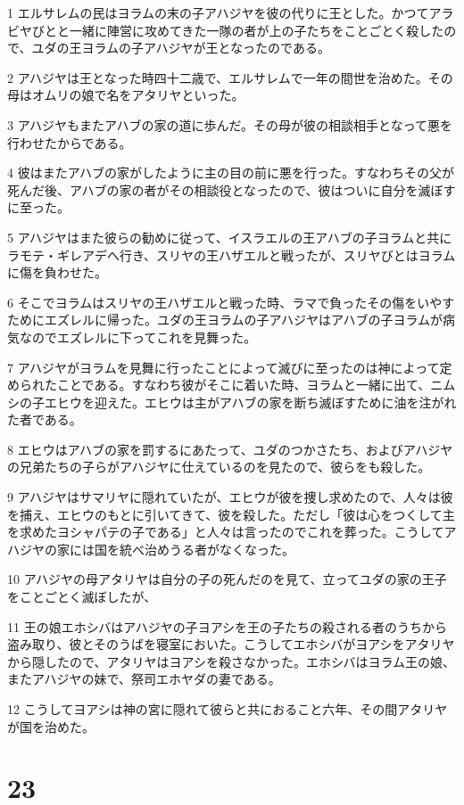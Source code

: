 \par 1 エルサレムの民はヨラムの末の子アハジヤを彼の代りに王とした。かつてアラビヤびとと一緒に陣営に攻めてきた一隊の者が上の子たちをことごとく殺したので、ユダの王ヨラムの子アハジヤが王となったのである。
\par 2 アハジヤは王となった時四十二歳で、エルサレムで一年の間世を治めた。その母はオムリの娘で名をアタリヤといった。
\par 3 アハジヤもまたアハブの家の道に歩んだ。その母が彼の相談相手となって悪を行わせたからである。
\par 4 彼はまたアハブの家がしたように主の目の前に悪を行った。すなわちその父が死んだ後、アハブの家の者がその相談役となったので、彼はついに自分を滅ぼすに至った。
\par 5 アハジヤはまた彼らの勧めに従って、イスラエルの王アハブの子ヨラムと共にラモテ・ギレアデへ行き、スリヤの王ハザエルと戦ったが、スリヤびとはヨラムに傷を負わせた。
\par 6 そこでヨラムはスリヤの王ハザエルと戦った時、ラマで負ったその傷をいやすためにエズレルに帰った。ユダの王ヨラムの子アハジヤはアハブの子ヨラムが病気なのでエズレルに下ってこれを見舞った。
\par 7 アハジヤがヨラムを見舞に行ったことによって滅びに至ったのは神によって定められたことである。すなわち彼がそこに着いた時、ヨラムと一緒に出て、ニムシの子エヒウを迎えた。エヒウは主がアハブの家を断ち滅ぼすために油を注がれた者である。
\par 8 エヒウはアハブの家を罰するにあたって、ユダのつかさたち、およびアハジヤの兄弟たちの子らがアハジヤに仕えているのを見たので、彼らをも殺した。
\par 9 アハジヤはサマリヤに隠れていたが、エヒウが彼を捜し求めたので、人々は彼を捕え、エヒウのもとに引いてきて、彼を殺した。ただし「彼は心をつくして主を求めたヨシャパテの子である」と人々は言ったのでこれを葬った。こうしてアハジヤの家には国を統べ治めうる者がなくなった。
\par 10 アハジヤの母アタリヤは自分の子の死んだのを見て、立ってユダの家の王子をことごとく滅ぼしたが、
\par 11 王の娘エホシバはアハジヤの子ヨアシを王の子たちの殺される者のうちから盗み取り、彼とそのうばを寝室においた。こうしてエホシバがヨアシをアタリヤから隠したので、アタリヤはヨアシを殺さなかった。エホシバはヨラム王の娘、またアハジヤの妹で、祭司エホヤダの妻である。
\par 12 こうしてヨアシは神の宮に隠れて彼らと共におること六年、その間アタリヤが国を治めた。

\chapter{23}

